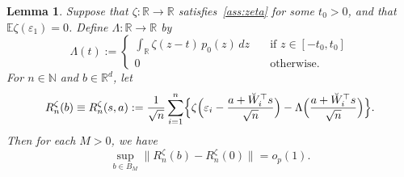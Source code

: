 \documentclass[a4paper]{article}
\newcommand{\N}{\mathbb{N}}
\newcommand{\R}{\mathbb{R}}
\newcommand{\E}{\mathbb{E}}
\newcommand{\norm}[1]{\|{#1}\|}
\newtheorem{lemma}[theorem]{Lemma}
\theoremstyle{definition}
\begin{document}
\begin{lemma}
\label{lem:linreg-zeta-equicontinuity}
Suppose that $\zeta \colon \R \to \R$ satisfies~\emph{\ref{ass:zeta}} for some $t_0 > 0$, and that $\E\zeta(\varepsilon_1) = 0$. Define $\Lambda \colon \R \to \R$ by
\begin{equation}
\label{eq:zeta-Lambda}
\Lambda(t) :=
\begin{cases}
\int_\R \zeta(z - t)\,p_0(z)\,dz \quad&\text{if }z \in [-t_0,t_0] \\
0 \quad&\text{otherwise}.
\end{cases}
\end{equation}
For $n \in \N$ and $b \in \R^d$, let
\[
R_n^\zeta(b) \equiv R_n^\zeta(s,a) := \frac{1}{\sqrt{n}}\sum_{i=1}^n \Bigl\{\zeta\Bigl(\varepsilon_i - \frac{a + \breve{W}_i^\top s}{\sqrt{n}}\Bigr) - \Lambda\Bigl(\frac{a + \breve{W}_i^\top s}{\sqrt{n}}\Bigr)\Bigr\}.
\]
Then for each $M > 0$, we have
\[
\sup_{b \in B_M}\norm{R_n^\zeta(b) - R_n^\zeta(0)} = o_p(1).
\]
\end{lemma}
\end{document}
